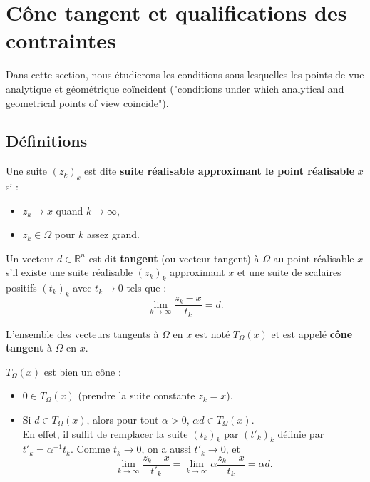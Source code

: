 \section{Cône tangent et qualifications des contraintes}

Dans cette section, nous étudierons les conditions sous lesquelles les points de vue analytique et géométrique coïncident ("conditions under which analytical and geometrical points of view coincide").

\subsection{Définitions}

\begin{definition}
    Une suite $(z_k)_k$ est dite \textbf{suite réalisable approximant le point réalisable} $x$ si :
    \begin{itemize}
        \item $z_k \to x$ quand $k \to \infty$,
        \item $z_k \in \Omega$ pour $k$ assez grand.
    \end{itemize}
\end{definition}

\begin{definition}
    Un vecteur $d \in \mathbb{R}^n$ est dit \textbf{tangent} (ou vecteur tangent) à $\Omega$ au point réalisable $x$ s'il existe une suite réalisable $(z_k)_k$ approximant $x$ et une suite de scalaires positifs $(t_k)_k$ avec $t_k \to 0$ tels que :
    \begin{equation}
        \lim_{k \to \infty} \frac{z_k - x}{t_k} = d.
    \end{equation}
\end{definition}



L'ensemble des vecteurs tangents à $\Omega$ en $x$ est noté $T_\Omega(x)$ et est appelé \textbf{cône tangent} à $\Omega$ en $x$.

\begin{remarque}
    $T_\Omega(x)$ est bien un cône :
    \begin{itemize}
        \item $0 \in T_\Omega(x)$ (prendre la suite constante $z_k = x$).
        \item Si $d \in T_\Omega(x)$, alors pour tout $\alpha > 0$, $\alpha d \in T_\Omega(x)$. \\
        En effet, il suffit de remplacer la suite $(t_k)_k$ par $(t'_k)_k$ définie par $t'_k = \alpha^{-1} t_k$. Comme $t_k \to 0$, on a aussi $t'_k \to 0$, et
        \[ \lim_{k \to \infty} \frac{z_k - x}{t'_k} = \lim_{k \to \infty} \alpha \frac{z_k - x}{t_k} = \alpha d. \]
    \end{itemize}
\end{remarque}

